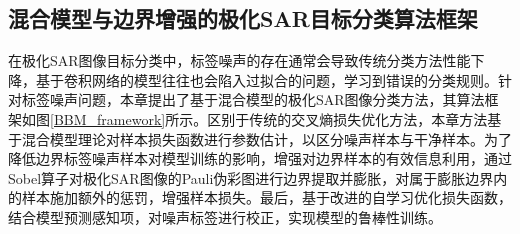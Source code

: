 

\subsection{混合模型与边界增强的极化SAR目标分类算法框架}


在极化SAR图像目标分类中，标签噪声的存在通常会导致传统分类方法性能下降，基于卷积网络的模型往往也会陷入过拟合的问题，学习到错误的分类规则。针对标签噪声问题，本章提出了基于混合模型的极化SAR图像分类方法，其算法框架如图\ref{BBM_framework}所示。区别于传统的交叉熵损失优化方法，本章方法基于混合模型理论对样本损失函数进行参数估计，以区分噪声样本与干净样本。为了降低边界标签噪声样本对模型训练的影响，增强对边界样本的有效信息利用，通过Sobel算子对极化SAR图像的Pauli伪彩图进行边界提取并膨胀，对属于膨胀边界内的样本施加额外的惩罚，增强样本损失。最后，基于改进的自学习优化损失函数，结合模型预测感知项，对噪声标签进行校正，实现模型的鲁棒性训练。

